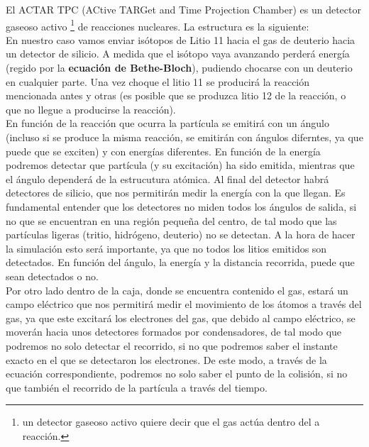 \documentclass[12pt,a4paper]{article}
\numberwithin{equation}{section}
\numberwithin{figure}{section}
\begin{document}
El ACTAR TPC (ACtive TARGet and Time Projection Chamber) es un detector gaseoso activo \footnote{un detector gaseoso activo quiere decir que el gas actúa dentro del a reacción.} de reacciones nucleares. La estructura es la siguiente: \\


En nuestro caso vamos enviar isótopos de Litio 11 hacia el gas de deuterio hacia un detector de silicio. A medida que el isótopo vaya avanzando perderá energía (regido por la {\bf ecuación de Bethe-Bloch}), pudiendo  chocarse con un deuterio en cualquier parte. Una vez choque el litio 11 se producirá la reacción mencionada antes y otras (es posible que se produzca litio 12 de la reacción, o que no llegue a producirse la reacción). \\

En función de la reacción que ocurra la partícula se emitirá con un ángulo (incluso si se produce la misma reacción, se emitirán con ángulos diferntes, ya que puede que se exciten) y con energías diferentes. En función de la energía podremos detectar que partícula (y su excitación) ha sido emitida, mientras que el ángulo dependerá de la estrucutura atómica. Al final del detector habrá detectores de silicio, que nos permitirán medir la energía con la que llegan. Es fundamental entender que los detectores no miden todos los ángulos de salida, si no que se encuentran en una región pequeña del centro, de tal modo que las partículas ligeras (tritio, hidrógeno, deuterio) no se detectan. A la hora de hacer la simulación esto será importante, ya que no todos los litios emitidos son detectados. En función del ángulo, la energía y la distancia recorrida, puede que sean detectados o no. \\

Por otro lado dentro de la caja, donde se encuentra contenido el gas, estará un campo eléctrico que nos permitirá medir el movimiento de los átomos a través del gas, ya que este excitará los electrones del gas, que debido al campo eléctrico, se moverán hacia unos detectores formados por condensadores, de tal modo que podremos no solo detectar el recorrido, si no que podremos saber el instante exacto en el que se detectaron los electrones. De este modo, a través de la ecuación correspondiente, podremos no solo saber el punto de la colisión, si no que también el recorrido de la partícula a través del tiempo.  \\
\end{document}
